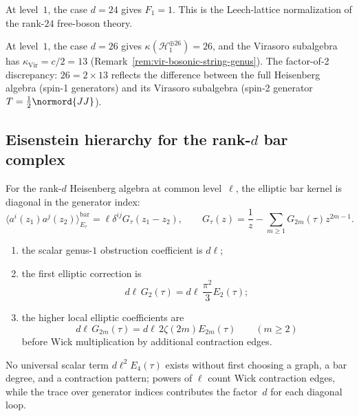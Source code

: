 \begin{computation}
At level~$1$, the case $d = 24$ gives $F_1 = 1$. This is the
Leech-lattice normalization of the rank-$24$ free-boson theory.

At level~$1$, the case $d = 26$ gives
$\kappa(\mathcal H_1^{\oplus 26}) = 26$, and the Virasoro subalgebra
has $\kappa_{\mathrm{Vir}} = c/2 = 13$
(Remark~\ref{rem:vir-bosonic-string-genus}). The factor-of-2
discrepancy: $26 = 2 \times 13$ reflects the difference between the
full Heisenberg algebra (spin-1 generators) and its Virasoro
subalgebra (spin-2 generator $T = \frac{1}{2}\normord{JJ}$).
\end{computation}


\subsection{\texorpdfstring{Eisenstein hierarchy for the rank-$d$ bar complex}{Eisenstein hierarchy for the rank-d bar complex}}

\begin{proposition}
\label{prop:multi-boson-eisenstein}
For the rank-$d$ Heisenberg algebra at common level~$\ell$, the
elliptic bar kernel is diagonal in the generator index:
\[
\langle a^i(z_1)a^j(z_2)\rangle_{E_\tau}^{\mathrm{bar}}
=\ell\delta^{ij}G_\tau(z_1-z_2),
\qquad
G_\tau(z)=\frac1z-\sum_{m\ge1}G_{2m}(\tau)z^{2m-1}.
\]
\begin{enumerate}[label=\textup{(\roman*)}]
\item the scalar genus-$1$ obstruction coefficient is
$d\ell$;
\item the first elliptic correction is
\begin{equation}\label{eq:multi-boson-E2}
d\ell\,G_2(\tau)
=d\ell\,\frac{\pi^2}{3}E_2(\tau);
\end{equation}
\item the higher local elliptic coefficients are
\begin{equation}\label{eq:multi-boson-E4}
d\ell\,G_{2m}(\tau)
=d\ell\,2\zeta(2m)E_{2m}(\tau)\qquad (m\ge2)
\end{equation}
before Wick multiplication by additional contraction edges.
\end{enumerate}
No universal scalar term $d\ell^2E_4(\tau)$ exists without first
choosing a graph, a bar degree, and a contraction pattern; powers of
$\ell$ count Wick contraction edges, while the trace over generator
indices contributes the factor~$d$ for each diagonal loop.
\end{proposition}

